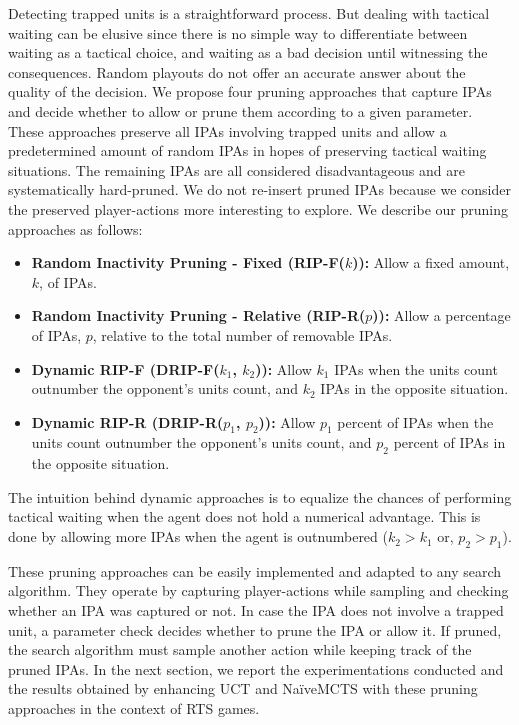 \documentclass[conference]{IEEEtran}
\begin{document}
Detecting trapped units is a straightforward process. But dealing with tactical waiting can be elusive since there is no simple way to differentiate between waiting as a tactical choice, and waiting as a bad decision until witnessing the consequences. Random playouts do not offer an accurate answer about the quality of the decision. We propose four pruning approaches that capture IPAs and decide whether to allow or prune them according to a given parameter. These approaches preserve all IPAs involving trapped units and allow a predetermined amount of random IPAs in hopes of preserving tactical waiting situations. The remaining IPAs are all considered disadvantageous and are systematically hard-pruned. We do not re-insert pruned IPAs because we consider the preserved player-actions more interesting to explore. We describe our pruning approaches as follows:

\begin{itemize}
\item \textbf{Random Inactivity Pruning - Fixed (RIP-F($k$)):} Allow a fixed amount, $k$, of IPAs.
\item \textbf{Random Inactivity Pruning - Relative (RIP-R($p$)):} Allow a percentage of IPAs, $p$, relative to the total number of removable IPAs.
\item \textbf{Dynamic RIP-F (DRIP-F($k_1$, $k_2$)):} Allow $k_1$ IPAs when the units count outnumber the opponent's units count, and $k_2$ IPAs in the opposite situation.
\item \textbf{Dynamic RIP-R (DRIP-R($p_1$, $p_2$)):} Allow $p_1$ percent of IPAs when the units count outnumber the opponent's units count, and $p_2$ percent of IPAs in the opposite situation.
\end{itemize}

The intuition behind dynamic approaches is to equalize the chances of performing tactical waiting when the agent does not hold a numerical advantage. This is done by allowing more IPAs when the agent is outnumbered ($k_2 > k_1$ or, $p_2 > p_1$).

These pruning approaches can be easily implemented and adapted to any search algorithm. They operate by capturing player-actions while sampling and checking whether an IPA was captured or not. In case the IPA does not involve a trapped unit, a parameter check decides whether to prune the IPA or allow it. If pruned, the search algorithm must sample another action while keeping track of the pruned IPAs. In the next section, we report the experimentations conducted and the results obtained by enhancing UCT and NaïveMCTS with these pruning approaches in the context of RTS games.
\end{document}

